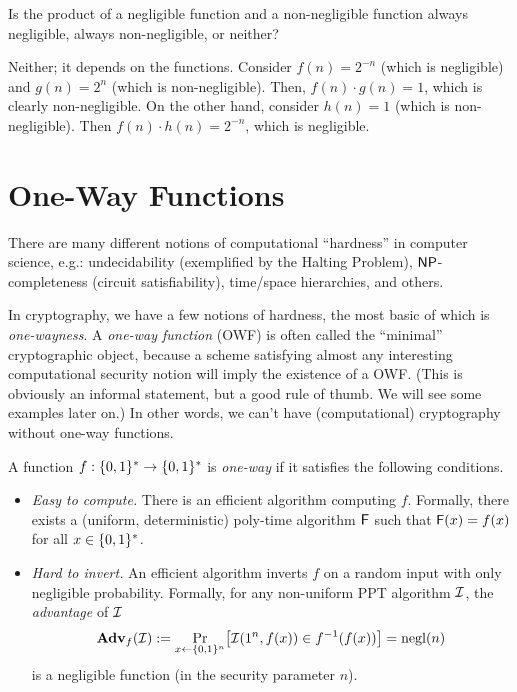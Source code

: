 \documentclass[11pt]{article}
\begin{document}
\begin{question}
  Is the product of a negligible function and a non-negligible
  function always negligible, always non-negligible, or neither?
\end{question}
  
\begin{answer}
  Neither; it depends on the functions. Consider \(f(n) = 2^{-n}\)
  (which is negligible) and \(g(n) = 2^n\) (which is non-negligible).
  Then, \(f(n) \cdot g(n) = 1\), which is clearly non-negligible. On
  the other hand, consider \(h(n) = 1\) (which is
  non-negligible). Then \(f(n) \cdot h(n) = 2^{-n}\), which is
  negligible.
\end{answer}

\section{One-Way Functions}
\label{sec:one-way-functions}

There are many different notions of computational ``hardness'' in
computer science, e.g.: undecidability (exemplified by the Halting
Problem), $\mathsf{NP}$-completeness (circuit satisfiability), time/space
hierarchies, and others.

In cryptography, we have a few notions of hardness, the most basic of
which is \emph{one-wayness}.  A \emph{one-way function} (OWF) is often
called the ``minimal'' cryptographic object, because a scheme
satisfying almost any interesting computational security notion will
imply the existence of a OWF.  (This is obviously an informal
statement, but a good rule of thumb.  We will see some examples later
on.)  In other words, we can't have (computational) cryptography
without one-way functions.

\begin{definition}
  \label{def:owf}
  A function $f : \{0,1\}^{*} \to \{0,1\}^{*}$ is \emph{one-way} if it
  satisfies the following conditions.
  \begin{itemize}
  \item \emph{Easy to compute.}  There is an efficient algorithm
    computing $f$.  Formally, there exists a (uniform, deterministic)
    poly-time algorithm $\mathsf{F}$ such that $\mathsf{F}(x) = f(x)$ for
    all $x \in \{0,1\}^{*}$.
  \item \emph{Hard to invert.}  An efficient algorithm inverts $f$ on
    a random input with only negligible probability.  Formally, for
    any non-uniform PPT algorithm $\mathcal{I}$, the \emph{advantage} of
    $\mathcal{I}$ \[ \advan_{f}(\Inv) := \Pr_{x \gets \bit^{n}} \bracks*{
      \Inv(1^{n}, f(x)) \in f^{-1}(f(x)) } = \negl(n) \] is a
    negligible function (in the security parameter $n$).
  \end{itemize}
\end{definition}
\end{document}
